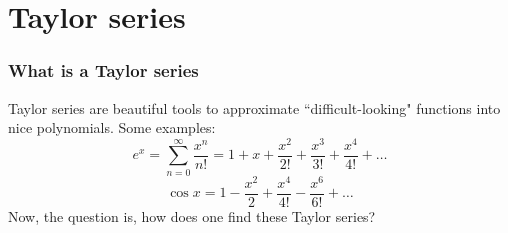 \iffalse

MIT License

Copyright (c) 2023 Aron Hardeman

Permission is hereby granted, free of charge, to any person obtaining a copy
of this software and associated documentation files (the "Software"), to deal
in the Software without restriction, including without limitation the rights
to use, copy, modify, merge, publish, distribute, sublicense, and/or sell
copies of the Software, and to permit persons to whom the Software is
furnished to do so, subject to the following conditions:

The above copyright notice and this permission notice shall be included in all
copies or substantial portions of the Software.

THE SOFTWARE IS PROVIDED "AS IS", WITHOUT WARRANTY OF ANY KIND, EXPRESS OR
IMPLIED, INCLUDING BUT NOT LIMITED TO THE WARRANTIES OF MERCHANTABILITY,
FITNESS FOR A PARTICULAR PURPOSE AND NONINFRINGEMENT. IN NO EVENT SHALL THE
AUTHORS OR COPYRIGHT HOLDERS BE LIABLE FOR ANY CLAIM, DAMAGES OR OTHER
LIABILITY, WHETHER IN AN ACTION OF CONTRACT, TORT OR OTHERWISE, ARISING FROM,
OUT OF OR IN CONNECTION WITH THE SOFTWARE OR THE USE OR OTHER DEALINGS IN THE
SOFTWARE.

\fi\section{Taylor series}
\begin{frame}
\frametitle{What is a Taylor series}

Taylor series are beautiful tools to approximate ``difficult-looking" functions into nice polynomials. Some examples:
\[e^x=\sum_{n=0}^{\infty}\frac{x^n}{n!}=1+x+\frac{x^2}{2!}+\frac{x^3}{3!}+\frac{x^4}{4!}+\hdots\]
\pause
\[\cos x =1-\frac{x^2}{2}+\frac{x^4}{4!}-\frac{x^6}{6!}+\hdots\]
\pause
Now, the question is, how does one find these Taylor series?
\end{frame}

